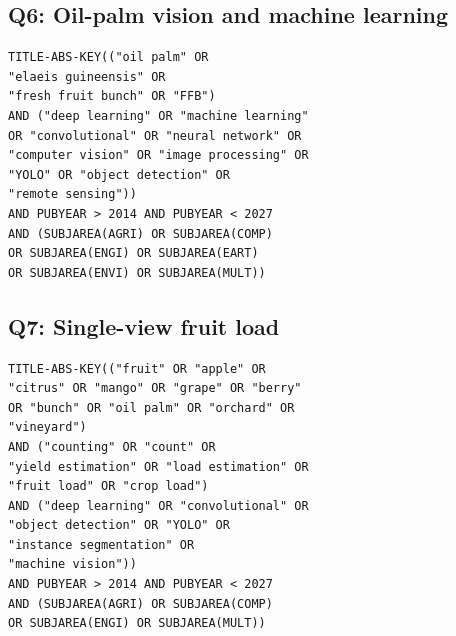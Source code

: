 \subsection*{Q6: Oil-palm vision and machine learning}
\begin{verbatim}
TITLE-ABS-KEY(("oil palm" OR
"elaeis guineensis" OR
"fresh fruit bunch" OR "FFB")
AND ("deep learning" OR "machine learning"
OR "convolutional" OR "neural network" OR
"computer vision" OR "image processing" OR
"YOLO" OR "object detection" OR
"remote sensing"))
AND PUBYEAR > 2014 AND PUBYEAR < 2027
AND (SUBJAREA(AGRI) OR SUBJAREA(COMP)
OR SUBJAREA(ENGI) OR SUBJAREA(EART)
OR SUBJAREA(ENVI) OR SUBJAREA(MULT))
\end{verbatim}

\subsection*{Q7: Single-view fruit load}
\begin{verbatim}
TITLE-ABS-KEY(("fruit" OR "apple" OR
"citrus" OR "mango" OR "grape" OR "berry"
OR "bunch" OR "oil palm" OR "orchard" OR
"vineyard")
AND ("counting" OR "count" OR
"yield estimation" OR "load estimation" OR
"fruit load" OR "crop load")
AND ("deep learning" OR "convolutional" OR
"object detection" OR "YOLO" OR
"instance segmentation" OR
"machine vision"))
AND PUBYEAR > 2014 AND PUBYEAR < 2027
AND (SUBJAREA(AGRI) OR SUBJAREA(COMP)
OR SUBJAREA(ENGI) OR SUBJAREA(MULT))
\end{verbatim}
